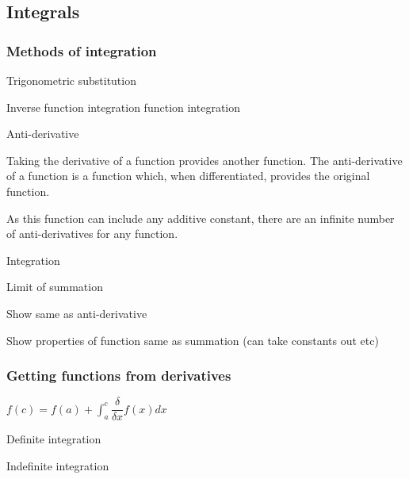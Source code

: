 
\subsection{Integrals}

\subsubsection{Methods of integration}

Trigonometric substitution

Inverse function integration function integration

Anti-derivative

Taking the derivative of a function provides another function. The anti-derivative of a function is a function which, when differentiated, provides the original function.

As this function can include any additive constant, there are an infinite number of anti-derivatives for any function.

Integration

Limit of summation

Show same as anti-derivative

Show properties of function same as summation (can take constants out etc)

\subsubsection{Getting functions from derivatives}

$f(c)=f(a)+\int^c_a \dfrac{\delta }{\delta x}f(x) dx$

Definite integration

Indefinite integration

